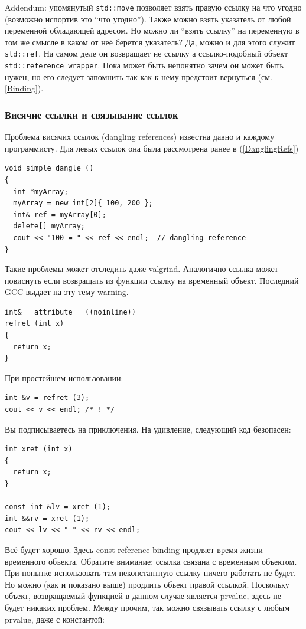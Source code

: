 \documentclass[a4paper,12pt,oneside]{article}
\begin{document}
Addendum: упомянутый \lstinline!std::move! позволяет взять правую ссылку на что угодно (возможно испортив это ``что угодно''). Также можно взять указатель от любой переменной обладающей адресом. Но можно ли ``взять ссылку'' на переменную в том же смысле в каком от неё берется указатель? Да, можно и для этого служит \lstinline!std::ref!. На самом деле он возвращает не ссылку а ссылко-подобный объект \lstinline!std::reference_wrapper!. Пока может быть непонятно зачем он может быть нужен, но его следует запомнить так как к нему предстоит вернуться (см. \ref{Binding}).

\subsubsection{Висячие ссылки и связывание ссылок}\label{DanglingRRefs}

Проблема висячих ссылок (dangling references) известна давно и каждому программисту. Для левых ссылок она была рассмотрена ранее в (\ref{DanglingRefs})

\begin{lstlisting}
void simple_dangle ()
{
  int *myArray;
  myArray = new int[2]{ 100, 200 };
  int& ref = myArray[0];
  delete[] myArray;
  cout << "100 = " << ref << endl;  // dangling reference  
}
\end{lstlisting}

Такие проблемы может отследить даже valgrind. Аналогично ссылка может повиснуть если возвращать из функции ссылку на временный объект. Последний GCC выдает на эту тему warning.

\begin{lstlisting}
int& __attribute__ ((noinline))
refret (int x)
{
  return x;
}
\end{lstlisting}

При простейшем использовании:

\begin{lstlisting}
int &v = refret (3);
cout << v << endl; /* ! */
\end{lstlisting}

Вы подписываетесь на приключения. На удивление, следующий код безопасен:

\begin{lstlisting}
int xret (int x)
{
  return x;
}

const int &lv = xret (1);
int &&rv = xret (1);
cout << lv << " " << rv << endl;
\end{lstlisting}

Всё будет хорошо. Здесь const reference binding продляет время жизни временного объекта. Обратите внимание: ссылка связана с временным объектом. При попытке использовать там неконстантную ссылку ничего работать не будет. Но можно (как и показано выше) продлить объект правой ссылкой. Поскольку объект, возвращаемый функцией в данном случае является prvalue, здесь не будет никаких проблем. Между прочим, так можно связывать ссылку с любым prvalue, даже с константой:
\end{document}
